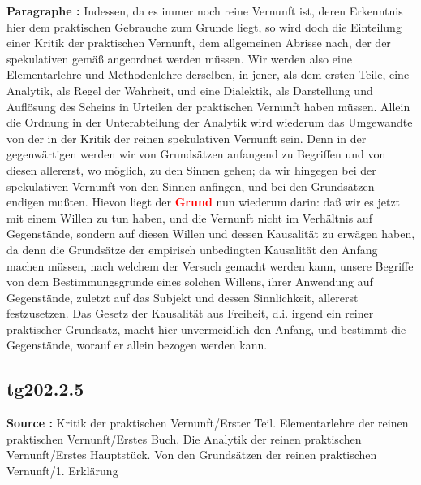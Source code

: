 \documentclass[a4paper,12pt,twoside]{book}
\newcommand{\match}[1]{\textcolor{red}{\textbf{#1}}}
\begin{document}
	\noindent\textbf{Paragraphe : }Indessen, da es immer noch reine Vernunft ist, deren Erkenntnis hier dem praktischen Gebrauche zum Grunde liegt, so wird doch die Einteilung einer Kritik der praktischen Vernunft, dem allgemeinen Abrisse nach, der der spekulativen gemäß angeordnet werden müssen. Wir werden also eine Elementarlehre und Methodenlehre derselben, in jener, als dem ersten Teile, eine Analytik, als Regel der Wahrheit, und eine Dialektik, als Darstellung und Auflösung des Scheins in Urteilen der praktischen Vernunft haben müssen. Allein die Ordnung in der Unterabteilung der Analytik wird wiederum das Umgewandte von der in der Kritik der reinen spekulativen Vernunft sein. Denn in der gegenwärtigen werden wir von Grundsätzen anfangend zu Begriffen und von diesen allererst, wo möglich, zu den Sinnen gehen; da wir hingegen bei der spekulativen Vernunft von den Sinnen anfingen, und bei den Grundsätzen endigen mußten. Hievon liegt der \match{Grund} nun wiederum darin: daß wir es jetzt mit einem Willen zu tun haben, und die Vernunft nicht im Verhältnis auf Gegenstände, sondern auf diesen Willen und dessen Kausalität zu erwägen haben, da denn die Grundsätze der empirisch unbedingten Kausalität den Anfang machen müssen, nach welchem der Versuch gemacht werden kann, unsere Begriffe von dem Bestimmungsgrunde eines solchen Willens, ihrer Anwendung auf Gegenstände, zuletzt auf das Subjekt und dessen Sinnlichkeit, allererst festzusetzen. Das Gesetz der Kausalität aus Freiheit, d.i. irgend ein reiner praktischer Grundsatz, macht hier unvermeidlich den Anfang, und bestimmt die Gegenstände, worauf er allein bezogen werden kann. 
	
	\subsection*{tg202.2.5} 
	\textbf{Source : }Kritik der praktischen Vernunft/Erster Teil. Elementarlehre der reinen praktischen Vernunft/Erstes Buch. Die Analytik der reinen praktischen Vernunft/Erstes Hauptstück. Von den Grundsätzen der reinen praktischen Vernunft/1. Erklärung\\  
	
\end{document}
